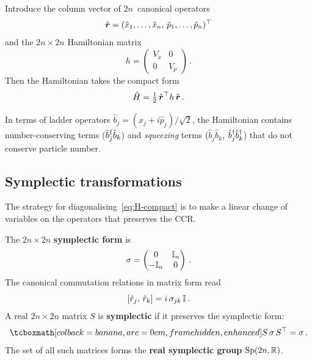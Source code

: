Introduce the column vector of $2n$~canonical operators
\begin{equation}\label{eq:r-vector}
  \hat{\boldsymbol{r}}
  = (\hat{x}_1,\ldots,\hat{x}_n,\,
     \hat{p}_1,\ldots,\hat{p}_n)^\top
\end{equation}
and the $2n \times 2n$ Hamiltonian matrix
\begin{equation}\label{eq:H-matrix}
  h = \begin{pmatrix} V_x & 0 \\ 0 & V_p \end{pmatrix}\,.
\end{equation}
Then the Hamiltonian takes the compact form
\begin{equation}\label{eq:H-compact}
  \hat{H} = \tfrac{1}{2}\,\hat{\boldsymbol{r}}^\top h\,\hat{\boldsymbol{r}}\,.
\end{equation}

In terms of ladder operators
$\hat{b}_j = (\hat{x}_j + i\hat{p}_j)/\sqrt{2}$, the Hamiltonian
contains number-conserving terms ($\hat{b}_j^\dagger \hat{b}_k$) and
\emph{squeezing} terms ($\hat{b}_j\hat{b}_k$,
$\hat{b}_j^\dagger\hat{b}_k^\dagger$) that do not conserve particle number.

\subsection{Symplectic transformations}%
\label{sec:symplectic}

The strategy for diagonalising~\eqref{eq:H-compact} is to make a
linear change of variables on the operators that preserves the CCR.

\begin{definition}%
\label{def:symplectic}
  The $2n \times 2n$ \textbf{symplectic form} is
  \begin{equation}\label{eq:sigma}
    \sigma = \begin{pmatrix} 0 & \mathbb{I}_n \\ -\mathbb{I}_n & 0 \end{pmatrix}\,.
  \end{equation}
  The canonical commutation relations in matrix form read
  \begin{equation}\label{eq:ccr-matrix}
    [\hat{r}_j,\, \hat{r}_k] = i\,\sigma_{jk}\,\mathbb{I}\,.
  \end{equation}
  A real $2n \times 2n$ matrix $S$ is \textbf{symplectic} if it
  preserves the symplectic form:
  \begin{equation}\label{eq:symplectic-cond}
    \eqbox{S\,\sigma\, S^\top = \sigma}\,.
  \end{equation}
  The set of all such matrices forms the \textbf{real symplectic group}
  $\mathrm{Sp}(2n,\mathbb{R})$.
\end{definition}

